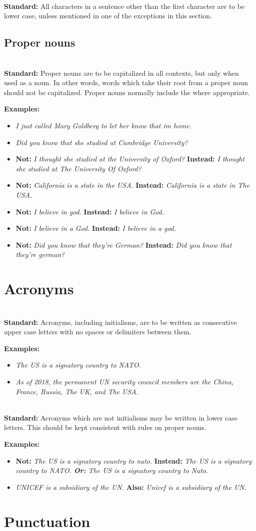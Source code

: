 \documentclass{article}
\newcommand{\standard}[1]{\quad  \\ \textbf{Standard:} {#1}}
\newcommand{\examples}[1]{
\textbf{Examples:} \begin{itemize}
#1
\end{itemize}
}
\newcommand{\example}[1]{\item \textit{#1}}
\newcommand{\nonexample}[2]{\item \textbf{Not:} \textit{#1} \textbf{Instead:}
  \textit{#2}}
\newcommand{\bothokay}[2]{\item \textit{#1} \textbf{Also:} \textit{#2}}
\newcommand{\langlequote}{\guillemotleft}
\newcommand{\ranglequote}{\guillemotright}
\begin{document}
\label{s:upper_case:sentence_tails}
\standard{All characters in a sentence other than the first character are to be
lower case, unless mentioned in one of the exceptions in this section.}

\subsection{Proper nouns}

\label{s:upper_case:proper_nouns}
\standard{Proper nouns are to be capitalized in all contexts, but only when used
as a noun. In other words, words which take their root from a proper noun should
not be capitalized. Proper nouns normally include \langlequote the \ranglequote
where appropriate.}

\examples{
  \example{I just called Mary Goldberg to let her know that im home.}
  \example{Did you know that she studied at Cambridge University?}
  \nonexample{I thought she studied at the University of Oxford?}{I thought
  she studied at The University Of Oxford?}
  \nonexample{California is a state in the USA.}{California is a state in The
  USA.}
  \nonexample{I believe in god.}{I believe in God.}
  \nonexample{I believe in a God.}{I believe in a god.}
  \nonexample{Did you know that they're German?}{Did you know that they're
  german?}
}

\section{Acronyms}

\label{s:upper_case:proper_nouns}
\standard{Acronyms, including initialisms, are to be written as consecutive
upper case letters with no spaces or delimiters between them.}

\examples{
  \example{The US is a signatory country to NATO.}
  \example{As of 2018, the permanent UN security council members are the China,
  France, Russia, The UK, and The USA.}
}

\standard{Acronyms which are not initialisms may be written in lower case
letters. This should be kept consistent with rules on proper nouns.}

\examples{
  \nonexample{The US is a signatory country to nato.}{The US is a signatory
  country to NATO. \textbf{Or:} The US is a signatory country to Nato.}
  \bothokay{UNICEF is a subsidiary of the UN.}{Unicef is a subsidiary of the
  UN.}
}

\section{Punctuation}
\end{document}
